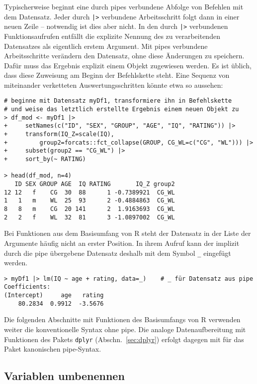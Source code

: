 Typischerweise beginnt eine durch pipes verbundene Abfolge von Befehlen mit dem Datensatz. Jeder durch \lstinline!|>! verbundene Arbeitsschritt folgt dann in einer neuen Zeile -- notwendig ist dies aber nicht. In den durch \lstinline!|>! verbundenen Funktionsaufrufen entfällt die explizite Nennung des zu verarbeitenden Datensatzes als eigentlich erstem Argument. Mit pipes verbundene Arbeitsschritte verändern den Datensatz, ohne diese Änderungen zu speichern. Dafür muss das Ergebnis explizit einem Objekt zugewiesen werden. Es ist üblich, dass diese Zuweisung am Beginn der Befehlskette steht. Eine Sequenz von miteinander verketteten Auswertungsschritten könnte etwa so aussehen:
\begin{lstlisting}
# beginne mit Datensatz myDf1, transformiere ihn in Befehlskette
# und weise das letztlich erstellte Ergebnis einem neuen Objekt zu
> df_mod <- myDf1 |>
+     setNames(c("ID", "SEX", "GROUP", "AGE", "IQ", "RATING")) |>
+     transform(IQ_Z=scale(IQ),
+         group2=forcats::fct_collapse(GROUP, CG_WL=c("CG", "WL"))) |>
+     subset(group2 == "CG_WL") |>
+     sort_by(~ RATING)

> head(df_mod, n=4)
   ID SEX GROUP AGE  IQ RATING       IQ_Z group2
12 12   f    CG  30  88      1 -0.7389921  CG_WL
1   1   m    WL  25  93      2 -0.4884863  CG_WL
8   8   m    CG  20 141      2  1.9163693  CG_WL
2   2   f    WL  32  81      3 -1.0897002  CG_WL
\end{lstlisting}

Bei Funktionen aus dem Basisumfang von R steht der Datensatz in der Liste der Argumente häufig nicht an erster Position. In ihrem Aufruf kann der implizit durch die pipe übergebene Datensatz deshalb mit dem Symbol \lstinline!_! eingefügt werden.
\begin{lstlisting}
> myDf1 |> lm(IQ ~ age + rating, data=_)    # _ für Datensatz aus pipe
Coefficients:
(Intercept)     age   rating
    80.2834  0.9912  -3.5676
\end{lstlisting}

Die folgenden Abschnitte mit Funktionen des Basisumfangs von R verwenden weiter die konventionelle Syntax ohne pipe. Die analoge Datenaufbereitung mit Funktionen des Pakets \lstinline!dplyr! (Abschn.\ \ref{sec:dplyr}) erfolgt dagegen mit für das Paket kanonischen pipe-Syntax.

\subsection{Variablen umbenennen}
\label{sec:df_rename}


